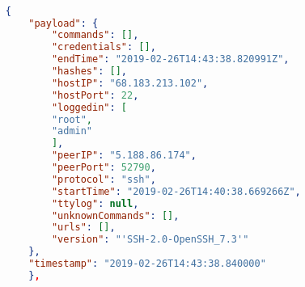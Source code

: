 
\begin{figure}[h!]
\begin{lstlisting}[language=json, 
    caption={Sample attack data gathered from the London HoneyPot. (ID fields omitted for brevity.)},
    captionpos=b, label={lst:data}]

    { 
        "payload": {
            "commands": [], 
            "credentials": [], 
            "endTime": "2019-02-26T14:43:38.820991Z", 
            "hashes": [], 
            "hostIP": "68.183.213.102", 
            "hostPort": 22, 
            "loggedin": [
            "root", 
            "admin"
            ], 
            "peerIP": "5.188.86.174", 
            "peerPort": 52790, 
            "protocol": "ssh", 
            "startTime": "2019-02-26T14:40:38.669266Z", 
            "ttylog": null, 
            "unknownCommands": [], 
            "urls": [], 
            "version": "'SSH-2.0-OpenSSH_7.3'"
        }, 
        "timestamp": "2019-02-26T14:43:38.840000"
        }, 

    \end{lstlisting}
\end{figure}